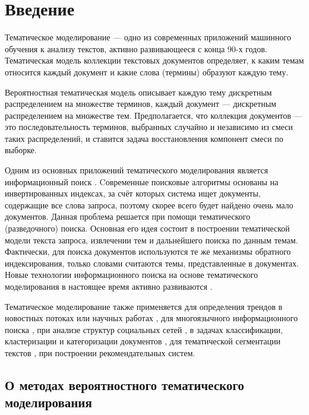 \documentclass[12pt]{article}
\renewcommand{\baselinestretch}{1.4}
\begin{document}
\tableofcontents
\newpage
\renewcommand{\baselinestretch}{1.5}
\section{Введение}

Тематическое моделирование --- одно из современных приложений машинного обучения к анализу текстов, активно развивающееся с конца 90-х годов. Тематическая модель коллекции текстовых документов определяет, к каким темам относится каждый документ и какие слова (термины) образуют каждую тему.

Вероятностная тематическая модель описывает каждую тему дискретным распределением на множестве терминов, каждый документ --- дискретным распределением на множестве тем. Предполагается, что коллекция документов --- это последовательность терминов, выбранных случайно и независимо из смеси таких распределений, и ставится задача восстановления компонент смеси по выборке.

Одним из основных приложений тематического моделирования является информационный поиск \cite{andrzejewski2011latent}. Cовременные поисковые алгоритмы основаны на инвертированных индексах, за счёт которых система ищет документы, содержащие все слова запроса, поэтому скорее всего будет найдено очень мало документов. Данная проблема решается при помощи тематического (разведочного) поиска. Основная его идея состоит в построении тематической модели текста запроса, извлечении тем и дальнейшего поиска по данным темам. Фактически, для поиска документов используются те же механизмы обратного индексирования, только словами считаются темы, представленные в документах. Новые технологии информационного поиска на основе тематического моделирования в настоящее время активно развиваются \cite{blei2007correlated, bolelli2009topic}.

Тематическое моделирование также применяется для определения трендов в новостных потоках или научных работах  \cite{cui2011textflow, zhang2010evolutionary}, для многоязычного информационного поиска  \cite{vulic2013cross, wallach2009rethinking}, при анализе структур социальных сетей \cite{varshney2014modeling, zhao2013originator},  в задачах классификации, кластеризации и категоризации документов \cite{rubin2012statistical, zhou2009text}, для тематической сегментации текстов \cite{wang2011structural}, при построении рекомендательных систем\cite{yin2015modeling, yin2014lcars}.

\subsection{О методах вероятностного тематического моделирования}
\end{document}
